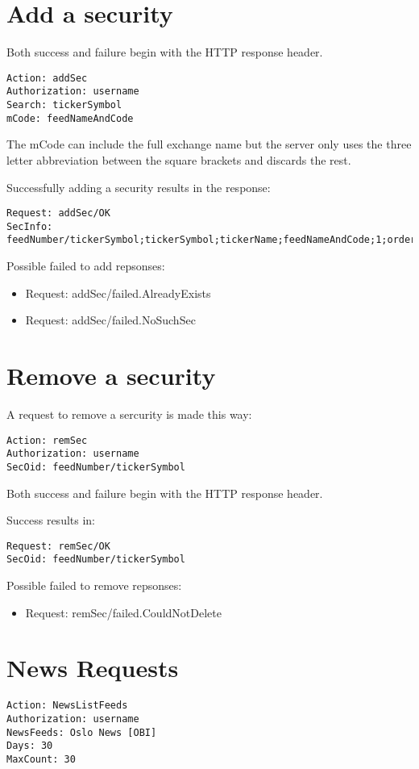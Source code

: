 \documentclass[12pt,twoside,letterpaper]{report}
\begin{document}
\section*{Add a security}
Both success and failure begin with the HTTP response header.

\begin{verbatim}
Action: addSec
Authorization: username
Search: tickerSymbol
mCode: feedNameAndCode
\end{verbatim}

The mCode can include the full exchange name but the server only uses the three letter abbreviation between the square brackets and discards the rest.

Successfully adding a security results in the response: 
\begin{lstlisting}
Request: addSec/OK
SecInfo: feedNumber/tickerSymbol;tickerSymbol;tickerName;feedNameAndCode;1;orderBook;ISIN;tickerExchangeCode
\end{lstlisting}

Possible failed to add repsonses:
\begin{itemize}
\item Request: addSec/failed.AlreadyExists
\item Request: addSec/failed.NoSuchSec
\end{itemize}

\section*{Remove a security}

A request to remove a sercurity is made this way:
\begin{verbatim}
Action: remSec
Authorization: username
SecOid: feedNumber/tickerSymbol
\end{verbatim}

Both success and failure begin with the HTTP response header.

Success results in:
\begin{verbatim}
Request: remSec/OK
SecOid: feedNumber/tickerSymbol
\end{verbatim}

Possible failed to remove repsonses:
\begin{itemize}
\item Request: remSec/failed.CouldNotDelete
\end{itemize}

\section*{News Requests}
\begin{verbatim}
Action: NewsListFeeds
Authorization: username
NewsFeeds: Oslo News [OBI]
Days: 30
MaxCount: 30
\end{verbatim}
\end{document}
